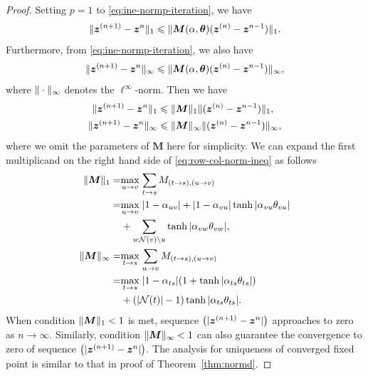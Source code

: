 \begin{proof}
  Setting $p=1$ to \eqref{eq:ine-normp-iteration}, we have
  \begin{equation}
    \| \bm{z}^{(n+1)} - \bm{z}^{n} \|_{1} \leqslant \| \bm{M}(\alpha, \bm{\theta})(\bm{z}^{(n)} - \bm{z}^{n-1}) \|_{1}.
  \end{equation}
  Furthermore, from \eqref{eq:ine-normp-iteration}, we also have
  \begin{equation}
    \| \bm{z}^{(n+1)} - \bm{z}^{n} \|_{\infty} \leqslant \| \bm{M}(\alpha, \bm{\theta})(\bm{z}^{(n)} - \bm{z}^{n-1}) \|_{\infty},
  \end{equation}
  where $\| \cdot \|_{\infty}$ denotes the $\ell^{\infty}$-norm.
  Then we have
  \begin{align}\label{eq:row-col-norm-ineq}
    \| \bm{z}^{(n+1)} - \bm{z}^{n} \|_{1} &\leqslant \| \bm{M} \|_{1}\| (\bm{z}^{(n)} - \bm{z}^{n-1}) \|_{1}, \nonumber \\
    \| \bm{z}^{(n+1)} - \bm{z}^{n} \|_{\infty} &\leqslant \| \bm{M} \|_{\infty}\| (\bm{z}^{(n)} - \bm{z}^{n-1}) \|_{\infty},
  \end{align}
  where we omit the parameters of $\bm{M}$ here for simplicity. We can expand the first multiplicand on the right hand side of \eqref{eq:row-col-norm-ineq} as follows
  \begin{align}
    \| \bm{M} \|_{1} =& \underset{u \rightarrow v}{\max}\;{\sum_{t\rightarrow s} M_{(t\rightarrow s), (u\rightarrow v)}} \nonumber \\
    =& \underset{u \rightarrow v}{\max}\;| 1-\alpha_{uv} | + | 1-\alpha_{vu} |\tanh{| \alpha_{vu} \theta_{vu} |} \nonumber \\
                    &+ \sum_{w \mathcal{N}(v) \backslash u} \tanh{| \alpha_{{vw}} \theta_{vw} |}, \nonumber \\
    \| \bm{M} \|_{\infty} =& \underset{t \rightarrow s}{\max}\;{\sum_{u\rightarrow v} M_{(t\rightarrow s), (u\rightarrow v)}} \nonumber \\
    =& \underset{t \rightarrow s}{\max}\; | 1-\alpha_{ts} | (1 + \tanh| \alpha_{ts} \theta_{ts} |) \nonumber \\
                    &+ (| \mathcal{N}(t) |-1)\tanh| \alpha_{ts} \theta_{ts} |.
  \end{align}
  When condition $\| \bm{M} \|_{1} < 1$ is met, sequence $\left( | \bm{z}^{(n+1)} - \bm{z}^{n} | \right)$ approaches to zero as $n\rightarrow \infty$. Similarly, condition $\| \bm{M} \|_{\infty}<1$ can also guarantee the convergence to zero of sequence $\left( | \bm{z}^{(n+1)} - \bm{z}^{n} | \right)$. The analysis for uniqueness of converged fixed point is similar to that in proof of Theorem~\ref{thm:normd}.
\end{proof}

